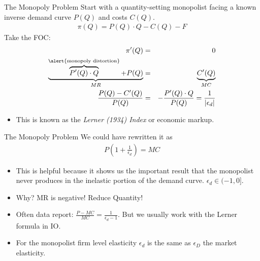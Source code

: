 \documentclass[xcolor=pdftex,dvipsnames,table,mathserif]{beamer}
\begin{document}
\begin{frame}{The Monopoly Problem}
Start with a quantity-setting monopolist facing a known inverse demand curve $P(Q)$ and costs $C(Q)$.
\begin{eqnarray*}
\pi(Q) = P(Q) \cdot Q - C(Q) -  F
\end{eqnarray*}
Take the FOC:
\begin{eqnarray*}
\pi'(Q) &=& 0  \\
 \underbrace{\overbrace{P'(Q) \cdot Q}^{\text{\alert{monopoly distortion}}}+ P(Q)}_{MR}  &=&  \underbrace{C'(Q)}_{MC} \\
  \frac{P(Q) - C'(Q)}{P(Q)} &=& - \frac{P'(Q) \cdot Q}{P(Q)} = \frac{1}{|\epsilon_d|}
\end{eqnarray*}
\begin{itemize}
\item This is known as the \textit{Lerner (1934) Index} or \alert{economic markup}.
\end{itemize}
\end{frame}

\begin{frame}{The Monopoly Problem}
We could have rewritten it as 
\begin{eqnarray*}
P \left( 1+\frac{1}{\epsilon_d} \right) = MC
\end{eqnarray*}
\begin{itemize}
\item This is helpful because it shows us the important result that the monopolist never produces in the inelastic portion of the demand curve. $\epsilon_d \in (-1,0]$.
\item Why? MR is negative! Reduce Quantity!
\item Often data report: $\frac{P-MC}{MC}= \frac{1}{\epsilon_d -1}$. But we usually work with the Lerner formula in IO.
\item For the monopolist firm level elasticity $\epsilon_d$ is the same as $\epsilon_D$ the market elasticity.
\end{itemize}
\end{frame}
\end{document}
